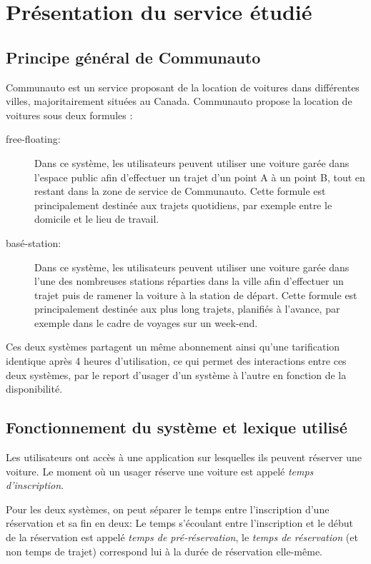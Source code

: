 \documentclass[12pt,a4paper]{article}
\author{Florian VERDIER}
\newcommand{\1}[1]{\mathbbm{1}_{\{#1\}} }
\theoremstyle{definition}
\begin{document}
\tableofcontents
\newpage

\section{Présentation du service étudié}
\subsection{Principe général de Communauto}
Communauto est un service proposant de la location de voitures dans différentes villes, majoritairement situées au Canada. Communauto propose la location de voitures sous deux formules :
\begin{description}
\item[free-floating:] Dans ce système, les utilisateurs peuvent utiliser une voiture garée dans l'espace public afin d'effectuer un trajet d'un point A à un point B, tout en restant dans la zone de service de Communauto. Cette formule est principalement destinée aux trajets quotidiens, par exemple entre le domicile et le lieu de travail.
\item[basé-station:] Dans ce système, les utilisateurs peuvent utiliser une voiture garée dans l'une des nombreuses stations réparties dans la ville afin d'effectuer un trajet puis de ramener la voiture à la station de départ. Cette formule est principalement destinée aux plus long trajets, planifiés à l'avance, par exemple dans le cadre de voyages sur un week-end. 
\end{description}

Ces deux systèmes partagent un même abonnement ainsi qu'une tarification identique après 4 heures d'utilisation, ce qui permet des interactions entre ces deux systèmes, par le report d'usager d'un système à l'autre en fonction de la disponibilité.

\subsection{Fonctionnement du système et lexique utilisé}

Les utilisateurs ont accès à une application sur lesquelles ils peuvent réserver une voiture. Le moment où un usager réserve une voiture est appelé \emph{temps d'inscription}.

Pour les deux systèmes, on peut séparer le temps entre l'inscription d'une réservation et sa fin en deux: Le temps s'écoulant entre l'inscription et le début de la réservation est appelé \emph{temps de pré-réservation}, le \emph{temps de réservation} (et non temps de trajet) correspond lui à la durée de réservation elle-même.
\end{document}
